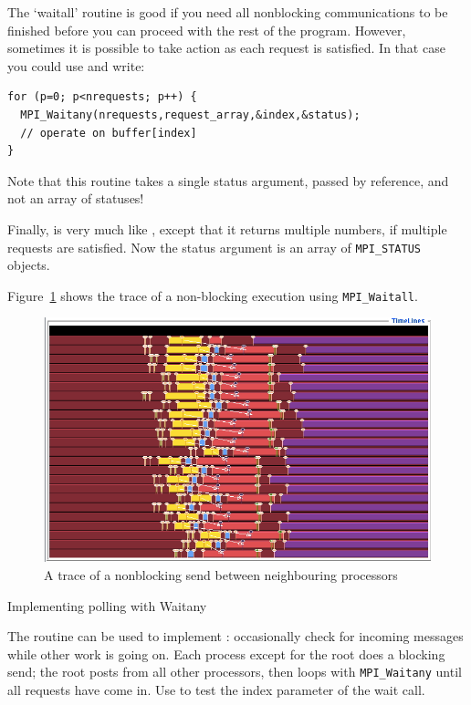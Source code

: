 

The `waitall' routine is good if you need all nonblocking
communications to be finished before you can proceed with the rest of
the program. However, sometimes it is possible to take action as each
request is satisfied. In that case you could use
 and write:

\begin{lstlisting}
for (p=0; p<nrequests; p++) {
  MPI_Waitany(nrequests,request_array,&index,&status);
  // operate on buffer[index]
}
\end{lstlisting}

Note that this routine takes a single status argument, passed by
reference, and not an array of statuses!


Finally,  is very much like ,
except that it returns multiple numbers, if multiple requests are
satisfied. Now the status argument is an array of \lstinline$MPI_STATUS$
objects.

Figure~\ref{fig:jump-nonblock} shows the trace of a non-blocking execution
using \lstinline$MPI_Waitall$.
\begin{figure}[ht]
\includegraphics[scale=.4]{graphics/linear-nonblock}
\caption{A trace of a nonblocking send between neighbouring processors}
\label{fig:jump-nonblock}
\end{figure}

 {Implementing polling with Waitany}

The  routine can be used to implement
: occasionally check for incoming messages while
other work is going on.
%
%
%
Each process except for the root does a blocking send; the root
posts  from all other processors, then loops
with \lstinline$MPI_Waitany$ until all requests have come in. Use
 to test the index parameter of the wait
call.

